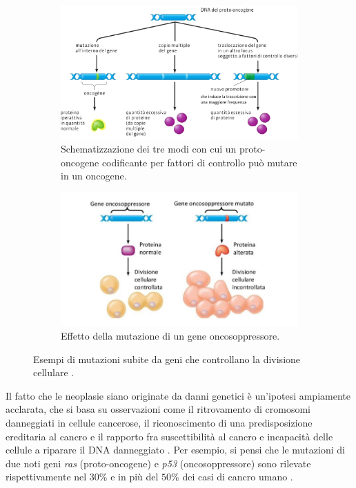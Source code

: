 \documentclass[12pt,a4paper,twoside]{report}
\begin{document}
	\begin{figure}[H]
		\centering
		\begin{subfigure}[b]{0.85\textwidth}
			\centering
			\includegraphics[width=\textwidth, scale=0.5]{oncogene.png}
			\caption{Schematizzazione dei tre modi con cui un proto-oncogene codificante per fattori di controllo può mutare in un oncogene.}
			\label{fig:oncogene}
		\end{subfigure}
		\par
		\begin{subfigure}[b]{0.85\textwidth}
			\centering
			\includegraphics[width=\textwidth, scale=0.5]{oncosoppressore.jpg}
			\caption{Effetto della mutazione di un gene oncosoppressore.}
			\label{fig:oncosoppressore}
		\end{subfigure}
		\caption{Esempi di mutazioni subite da geni che controllano la divisione cellulare \cite{campbell2anno}.}
		\label{fig:mutazioni_genetiche}
	\end{figure}
	Il fatto che le neoplasie siano originate da danni genetici è un'ipotesi ampiamente acclarata, che si basa su osservazioni come il ritrovamento di cromosomi danneggiati in cellule cancerose, il riconoscimento di una predisposizione ereditaria al cancro e il rapporto fra suscettibilità al cancro e incapacità delle cellule a riparare il DNA danneggiato \cite{treccani_oncogeni}. Per esempio, si pensi che le mutazioni di due noti geni \textit{ras} (proto-oncogene) e \textit{p53} (oncosoppressore) sono rilevate rispettivamente nel $30\%$ e in più del $50\%$ dei casi di cancro umano \cite{campbell3anno}.
	
\end{document}
